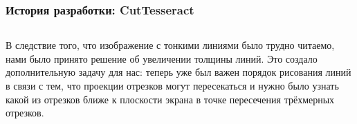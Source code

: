 \documentclass[10pt,pdf,hyperref={unicode}]{beamer}
\begin{document}
\begin{frame}
	\frametitle{История разработки: {\bf CutTesseract}}
	\begin{columns}
		В следствие того, что изображение с тонкими линиями было
		трудно читаемо, нами было принято решение об увеличении толщины линий.
		Это создало дополнительную задачу для нас: теперь уже был важен
		порядок рисования линий в связи с тем, что проекции отрезков
		могут пересекаться и нужно было узнать какой из отрезков ближе к 
		плоскости экрана в точке пересечения трёхмерных отрезков.
	\end{columns}
\end{frame}
\end{document}
